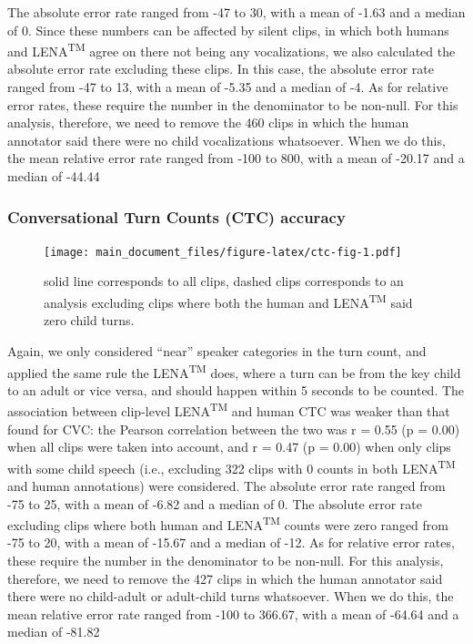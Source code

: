 \documentclass[english,floatsintext,man]{apa6}
\begin{document}
The absolute error rate ranged from -47 to 30, with a mean of -1.63 and
a median of 0. Since these numbers can be affected by silent clips, in
which both humans and LENA\textsuperscript{TM} agree on there not being
any vocalizations, we also calculated the absolute error rate excluding
these clips. In this case, the absolute error rate ranged from -47 to
13, with a mean of -5.35 and a median of -4. As for relative error
rates, these require the number in the denominator to be non-null. For
this analysis, therefore, we need to remove the 460 clips in which the
human annotator said there were no child vocalizations whatsoever. When
we do this, the mean relative error rate ranged from -100 to 800, with a
mean of -20.17 and a median of -44.44

\subsubsection{Conversational Turn Counts (CTC)
accuracy}\label{conversational-turn-counts-ctc-accuracy}

\begin{figure}
\centering
\texttt{[image: main\_document\_files/figure-latex/ctc-fig-1.pdf]}
\caption{\label{fig:ctc-fig}solid line corresponds to all clips, dashed
clips corresponds to an analysis excluding clips where both the human
and LENA\textsuperscript{TM} said zero child turns.}
\end{figure}

Again, we only considered \enquote{near} speaker categories in the turn
count, and applied the same rule the LENA\textsuperscript{TM} does,
where a turn can be from the key child to an adult or vice versa, and
should happen within 5 seconds to be counted. The association between
clip-level LENA\textsuperscript{TM} and human CTC was weaker than that
found for CVC: the Pearson correlation between the two was r = 0.55 (p =
0.00) when all clips were taken into account, and r = 0.47 (p = 0.00)
when only clips with some child speech (i.e., excluding 322 clips with 0
counts in both LENA\textsuperscript{TM} and human annotations) were
considered. The absolute error rate ranged from -75 to 25, with a mean
of -6.82 and a median of 0. The absolute error rate excluding clips
where both human and LENA\textsuperscript{TM} counts were zero ranged
from -75 to 20, with a mean of -15.67 and a median of -12. As for
relative error rates, these require the number in the denominator to be
non-null. For this analysis, therefore, we need to remove the 427 clips
in which the human annotator said there were no child-adult or
adult-child turns whatsoever. When we do this, the mean relative error
rate ranged from -100 to 366.67, with a mean of -64.64 and a median of
-81.82
\end{document}
